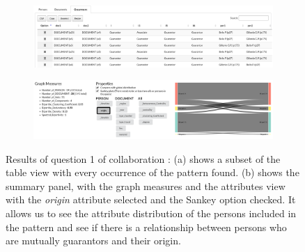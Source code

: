 
\begin{figure}[!ht]
    \centering
    \begin{subfigure}[b]{\linewidth}
        \includegraphics[width=\textwidth]{static/figures/ComBiNet/Piemont-mutual-guarantor-table}
    \caption{}
    \end{subfigure}

    \begin{subfigure}[b]{\linewidth}
            \includegraphics[width=\textwidth]{static/figures/ComBiNet/piemont-mutual-guarantors-results}
    \caption{}
    \end{subfigure}

    \caption{Results of question 1 of collaboration \pascal: (a) shows a subset of the table view with every occurrence of the pattern found. (b) shows the summary panel, with the graph measures and the attributes view with the \textit{origin} attribute selected and the Sankey option checked. It allows us to see the attribute distribution of the persons included in the pattern and see if there is a relationship between persons who are mutually guarantors and their origin.
    }\label{fig:combinet-example-results}
\end{figure}




